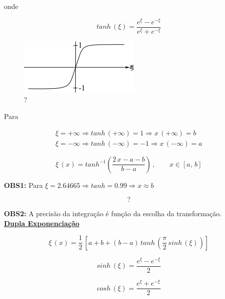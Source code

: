 onde

\begin{equation}
 \label{cap2:sec8:eq3}
 tanh\,(\xi) = \frac{e^\xi - e^{-\xi}}{e^\xi + e^{-\xi}}
\end{equation}

\begin{figure}[htb]
 \centering
 \includegraphics[scale=1.0]{capitulos/capitulo2/figuras/int_func_lim_inf3.png}
 \caption{?}
 \label{fig:int_func_lim_inf3}
\end{figure}

Para

\[
 \begin{array}{l}
  \xi = + \infty \Rightarrow tanh\,(+\infty) = 1 \Rightarrow x\,(+\infty) = b \\
  \xi = - \infty \Rightarrow tanh\,(-\infty) = -1 \Rightarrow x\,(-\infty) = a
 \end{array}
\]

\begin{equation}
 \label{cap2:sec8:eq4}
 \xi\,(x) = tanh^{-1} \left( \frac{2\,x - a - b}{b - a} \right)\,, \qquad x \in [a,\,b]
\end{equation}

\textbf{OBS1:} Para $\xi = 2.64665 \Rightarrow tanh = 0.99 \Rightarrow x \approx b$

\[
 ?
\]

\textbf{OBS2:} A precisão da integração é função da escolha da transformação.\\

\underline{\textbf{Dupla Exponenciação}}

\begin{equation}
 \label{cap2:sec8:eq5}
 \xi\,(x) = \frac{1}{2} \, \left[ a + b + (b - a) \, tanh \, \left( \frac{\pi}{2} \, sinh\,(\xi) \right) \right]
\end{equation}

\begin{equation}
 \label{cap2:sec8:eq6}
 sinh\,(\xi) = \frac{e^\xi - e^{-\xi}}{2}
\end{equation}

\begin{equation}
 \label{cap2:sec8:eq7}
 cosh\,(\xi) = \frac{e^\xi + e^{-\xi}}{2}
\end{equation}

